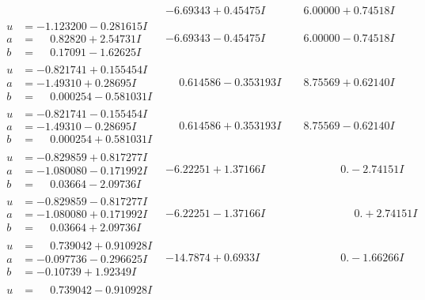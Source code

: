 \documentclass[1p]{elsarticle_modified}
\theoremstyle{definition}
\begin{document}
$$\begin{array}{c|c|c}
 & -6.69343 + 0.45475 I & \phantom{-}6.00000 + 0.74518 I \\ \hline\begin{aligned}
u &= -1.123200 - 0.281615 I \\
a &= \phantom{-}0.82820 + 2.54731 I \\
b &= \phantom{-}0.17091 - 1.62625 I\end{aligned}
 & -6.69343 - 0.45475 I & \phantom{-}6.00000 - 0.74518 I \\ \hline\begin{aligned}
u &= -0.821741 + 0.155454 I \\
a &= -1.49310 + 0.28695 I \\
b &= \phantom{-}0.000254 - 0.581031 I\end{aligned}
 & \phantom{-}0.614586 - 0.353193 I & \phantom{-}8.75569 + 0.62140 I \\ \hline\begin{aligned}
u &= -0.821741 - 0.155454 I \\
a &= -1.49310 - 0.28695 I \\
b &= \phantom{-}0.000254 + 0.581031 I\end{aligned}
 & \phantom{-}0.614586 + 0.353193 I & \phantom{-}8.75569 - 0.62140 I \\ \hline\begin{aligned}
u &= -0.829859 + 0.817277 I \\
a &= -1.080080 - 0.171992 I \\
b &= \phantom{-}0.03664 - 2.09736 I\end{aligned}
 & -6.22251 + 1.37166 I & \phantom{-0.000000 } 0. - 2.74151 I \\ \hline\begin{aligned}
u &= -0.829859 - 0.817277 I \\
a &= -1.080080 + 0.171992 I \\
b &= \phantom{-}0.03664 + 2.09736 I\end{aligned}
 & -6.22251 - 1.37166 I & \phantom{-0.000000 -}0. + 2.74151 I \\ \hline\begin{aligned}
u &= \phantom{-}0.739042 + 0.910928 I \\
a &= -0.097736 - 0.296625 I \\
b &= -0.10739 + 1.92349 I\end{aligned}
 & -14.7874 + 0.6933 I & \phantom{-0.000000 } 0. - 1.66266 I \\ \hline\begin{aligned}
u &= \phantom{-}0.739042 - 0.910928 I \\

\end{aligned}
\end{array}$$
\end{document}
